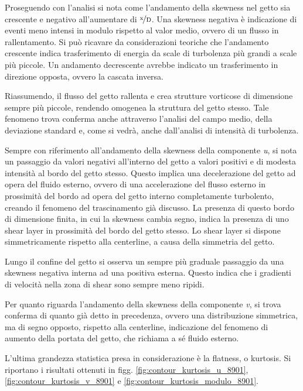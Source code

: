 \documentclass{article} %
\begin{document}
Proseguendo con l'analisi si nota come l'andamento della skewness nel getto sia crescente e negativo all'aumentare di $\nicefrac{\textrm{x}}{\textrm{D}}$. Una skewness negativa è indicazione di eventi meno intensi in modulo rispetto al valor medio, ovvero di un flusso in rallentamento. Si può ricavare da considerazioni teoriche che l'andamento crescente indica trasferimento di energia da scale di turbolenza più grandi a scale più piccole. Un andamento decrescente avrebbe indicato un trasferimento in direzione opposta, ovvero la cascata inversa.\par
Riassumendo, il flusso del getto rallenta e crea strutture vorticose di dimensione sempre più piccole, rendendo omogenea la struttura del getto stesso. Tale fenomeno trova conferma anche attraverso l'analisi del campo medio, della deviazione standard e, come si vedrà, anche dall'analisi di intensità di turbolenza.\par
Sempre con riferimento all'andamento della skewness della componente \textit{u}, si nota un passaggio da valori negativi all'interno del getto a valori positivi e di modesta intensità al bordo del getto stesso. Questo implica una decelerazione del getto ad opera del fluido esterno, ovvero di una accelerazione del flusso esterno in prossimità del bordo ad opera del getto interno completamente turbolento, creando il fenomeno del trascinamento già discusso. La presenza di questo bordo di dimensione finita, in cui la skewness cambia segno, indica la presenza di uno shear layer in prossimità del bordo del getto stesso. Lo shear layer si dispone simmetricamente rispetto alla centerline, a causa della simmetria del getto.\par
Lungo il confine del getto si osserva un sempre più graduale passaggio da una skewness negativa interna ad una positiva esterna. Questo indica che i gradienti di velocità nella zona di shear sono sempre meno ripidi.\par
Per quanto riguarda l'andamento della skewness della componente \textit{v}, si trova conferma di quanto già detto in precedenza, ovvero una distribuzione simmetrica, ma di segno opposto, rispetto alla centerline, indicazione del fenomeno di aumento della portata del getto, che richiama a sé fluido esterno.\par
\clearpage
L'ultima grandezza statistica presa in considerazione è la flatness, o kurtosis. Si riportano i risultati ottenuti in figg. \ref{fig:contour_kurtosis_u_8901}, \ref{fig:contour_kurtosis_v_8901} e \ref{fig:contour_kurtosis_modulo_8901}.
\end{document}
